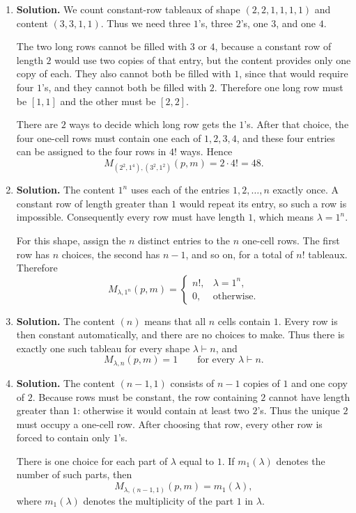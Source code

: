 \documentclass{article}
\begin{document}
\begin{enumerate}
After making one choice for every row, the exponent of $x_i$ is the
total number of cells filled with $i$.  Hence the resulting monomial
has exponent sequence $\mu$ exactly when the filling has content
$\mu$.  We have therefore proved the combinatorial interpretation
\[
\boxed{M_{\lambda,\mu}(p,m)
=\#\{\text{constant-row fillings of shape $\lambda$ and content $\mu$}\}.}
\]

\item \textbf{Solution.}
We count constant-row tableaux of shape $(2,2,1,1,1,1)$ and content
$(3,3,1,1)$.  Thus we need three $1$'s, three $2$'s, one $3$, and one
$4$.

The two long rows cannot be filled with $3$ or $4$, because a constant
row of length $2$ would use two copies of that entry, but the content
provides only one copy of each.  They also cannot both be filled with
$1$, since that would require four $1$'s, and they cannot both be
filled with $2$.  Therefore one long row must be $[1,1]$ and the other
must be $[2,2]$.

There are $2$ ways to decide which long row gets the $1$'s.  After
that choice, the four one-cell rows must contain one each of
$1,2,3,4$, and these four entries can be assigned to the four rows in
$4!$ ways.  Hence
\[
\boxed{M_{(2^2,1^4),(3^2,1^2)}(p,m)=2\cdot4!=48.}
\]

\item \textbf{Solution.}
The content $1^n$ uses each of the entries $1,2,\ldots,n$ exactly
once.  A constant row of length greater than $1$ would repeat its
entry, so such a row is impossible.  Consequently every row must have
length $1$, which means $\lambda=1^n$.

For this shape, assign the $n$ distinct entries to the $n$ one-cell
rows.  The first row has $n$ choices, the second has $n-1$, and so on,
for a total of $n!$ tableaux.  Therefore
\[
\boxed{M_{\lambda,1^n}(p,m)=
\begin{cases}
n!,&\lambda=1^n,\\
0,&\text{otherwise}.
\end{cases}}
\]

\item \textbf{Solution.}
The content $(n)$ means that all $n$ cells contain $1$.  Every row is
then constant automatically, and there are no choices to make.  Thus
there is exactly one such tableau for every shape $\lambda\vdash n$,
and
\[
\boxed{M_{\lambda,n}(p,m)=1}
\qquad\text{for every }\lambda\vdash n.
\]

\item \textbf{Solution.}
The content $(n-1,1)$ consists of $n-1$ copies of $1$ and one copy of
$2$.  Because rows must be constant, the row containing $2$ cannot
have length greater than $1$: otherwise it would contain at least two
$2$'s.  Thus the unique $2$ must occupy a one-cell row.  After choosing
that row, every other row is forced to contain only $1$'s.

There is one choice for each part of $\lambda$ equal to $1$.  If
$m_1(\lambda)$ denotes the number of such parts, then
\[
\boxed{M_{\lambda,(n-1,1)}(p,m)=m_1(\lambda),}
\]
where $m_1(\lambda)$ denotes the multiplicity of the part $1$ in
$\lambda$.

\end{enumerate}
\end{document}
